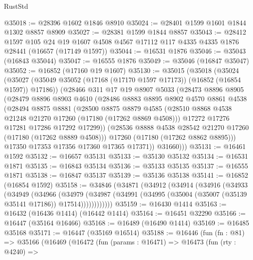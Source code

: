 \begin{lexlean}{RustStd}
\begin{coremodule}
{\begin{coremodule}
{{{{{{{{{{{{{{{{{{{{{{{{{{{{{{{{{{{{{{{{{{{{{{{{{{{{{{{@35018 := @28396 @1602 @1846 @8910
@35024 := @28401 @1599 @1601 @1844 @1302 @8857 @8909
@35027 := @28381 @1599 @1844 @8857
@35043 := @28412
    @1597
    @105
    @24
    @19
    @1607
    @4508
    @4567
    @17112
    @117
    @4335
    @4335
    @1876
    @28441
    (@16657 (@17149 @1597))
@35044 := @16531 @1876
@35046 := @35043 (@16843 @35044)
@35047 := @16555 @1876
@35049 := @35046 (@16847 @35047)
@35052 := @16852 (@17160 @19 @1607)
@35130 := @35015
    (@35018
      (@35024
        (@35027 (@35049 @35052 (@17168 (@17170 @1597 @17173)) (@16852 (@16854 @1597)) @17186))
        (@28466
          @311
          @17
          @19
          @8907
          @5033
          (@28473
            @8896
            @8905
            (@28479
              @8896
              @8903
              @4610
              (@28486
                @8883
                @8895
                @8902
                @4570
                @8861
                @4538
                (@28494
                  @8875
                  @8881
                  (@28500
                    @8875
                    @8879
                    @4585
                    (@28510 @8868 @4538 @21248 @21270 @17260 (@17180 (@17262 @8869 @4508)))
                    @17272
                    @17276
                    @17281
                    @17286
                    @17292
                    @17299))
                (@28536 @8888 @4538 @28542 @21270 @17260 (@17180 (@17262 @8889 @4508)))
                @17260
                (@17180 (@17262 @8862 @8895)))
              @17350
              @17353
              @17356
              @17360
              @17365
              @17371))
          @31660)))
@35131 := @16461 @1592
@35132 := @16657 @35131
@35133 := @35130 @35132
@35134 := @16531 @1871
@35135 := @16843 @35134
@35136 := @35133 @35135
@35137 := @16555 @1871
@35138 := @16847 @35137
@35139 := @35136 @35138
@35141 := @16852 (@16854 @1592)
@35158 := @34846
    (@34871
      (@34912
        (@34914
          (@34916
            (@34933
              (@34949
                (@34966
                  (@34979
                    (@34987
                      (@34991 (@34995 (@35004 (@35007 (@35139 @35141 @17186)) @17514))))))))))))
@35159 := @16430 @1414
@35163 := @16432 (@16436 @1414) (@16442 @1414)
@35164 := @16451 @32290
@35166 := @16447 (@35164 @16466)
@35168 := @16489 (@16490 @1414)
@35169 := @16485 @35168
@35171 := @16447 (@35169 @16514)
@35188 := @16446
    (fun (fn : @81) =>
    @35166
      (@16469
        (@16472
          (fun (params : @16471) =>
          @16473
            (fun (rty : @4240) =>
}}}}}}}}}}}}}}}}}}}}}}}}}}}}}}}}}}}}}}}}}}}}}}}}}}}}}}}
\end{coremodule}}
\end{coremodule}
\end{lexlean}

